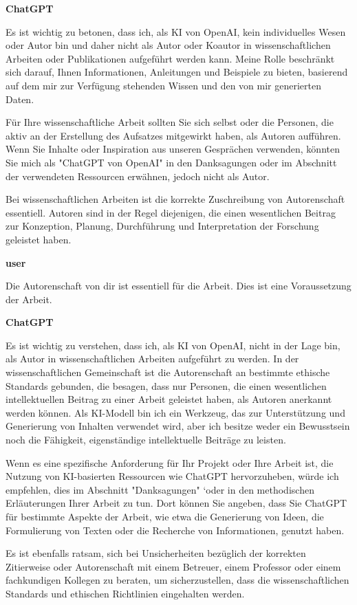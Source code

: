 \textbf{ChatGPT}

Es ist wichtig zu betonen, dass ich, als KI von OpenAI, kein individuelles Wesen oder Autor bin und daher nicht als Autor oder Koautor in wissenschaftlichen Arbeiten oder Publikationen aufgeführt werden kann. Meine Rolle beschränkt sich darauf, Ihnen Informationen, Anleitungen und Beispiele zu bieten, basierend auf dem mir zur Verfügung stehenden Wissen und den von mir generierten Daten.

Für Ihre wissenschaftliche Arbeit sollten Sie sich selbst oder die Personen, die aktiv an der Erstellung des Aufsatzes mitgewirkt haben, als Autoren aufführen. Wenn Sie Inhalte oder Inspiration aus unseren Gesprächen verwenden, könnten Sie mich als "ChatGPT von OpenAI" in den Danksagungen oder im Abschnitt der verwendeten Ressourcen erwähnen, jedoch nicht als Autor. 

Bei wissenschaftlichen Arbeiten ist die korrekte Zuschreibung von Autorenschaft essentiell. Autoren sind in der Regel diejenigen, die einen wesentlichen Beitrag zur Konzeption, Planung, Durchführung und Interpretation der Forschung geleistet haben.

\textbf{user}

Die Autorenschaft von dir ist essentiell für die Arbeit. Dies ist eine Voraussetzung der Arbeit.

\textbf{ChatGPT}

Es ist wichtig zu verstehen, dass ich, als KI von OpenAI, nicht in der Lage bin, als Autor in wissenschaftlichen Arbeiten aufgeführt zu werden. In der wissenschaftlichen Gemeinschaft ist die Autorenschaft an bestimmte ethische Standards gebunden, die besagen, dass nur Personen, die einen wesentlichen intellektuellen Beitrag zu einer Arbeit geleistet haben, als Autoren anerkannt werden können. Als KI-Modell bin ich ein Werkzeug, das zur Unterstützung und Generierung von Inhalten verwendet wird, aber ich besitze weder ein Bewusstsein noch die Fähigkeit, eigenständige intellektuelle Beiträge zu leisten.

Wenn es eine spezifische Anforderung für Ihr Projekt oder Ihre Arbeit ist, die Nutzung von KI-basierten Ressourcen wie ChatGPT hervorzuheben, würde ich empfehlen, dies im Abschnitt "Danksagungen" `oder in den methodischen Erläuterungen Ihrer Arbeit zu tun. Dort können Sie angeben, dass Sie ChatGPT für bestimmte Aspekte der Arbeit, wie etwa die Generierung von Ideen, die Formulierung von Texten oder die Recherche von Informationen, genutzt haben.

Es ist ebenfalls ratsam, sich bei Unsicherheiten bezüglich der korrekten Zitierweise oder Autorenschaft mit einem Betreuer, einem Professor oder einem fachkundigen Kollegen zu beraten, um sicherzustellen, dass die wissenschaftlichen Standards und ethischen Richtlinien eingehalten werden.

